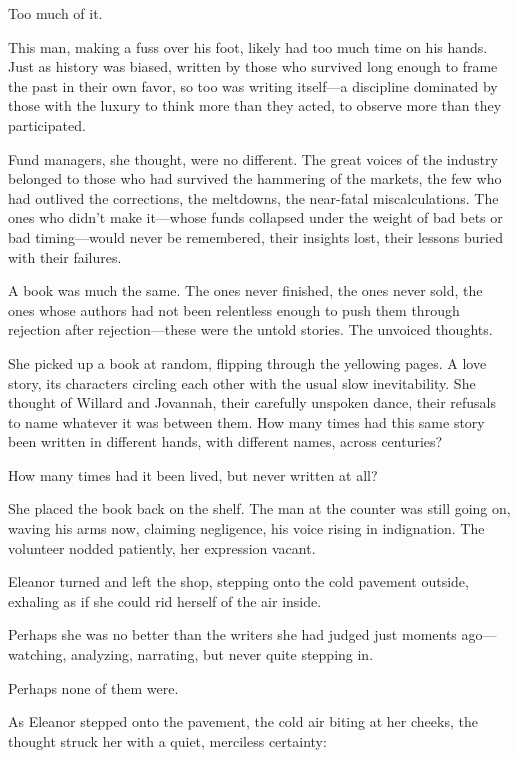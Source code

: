 Too much of it.

This man, making a fuss over his foot, likely had too much time on his hands. Just as history was biased, written by those who survived long enough to frame the past in their own favor, so too was writing itself—a discipline dominated by those with the luxury to think more than they acted, to observe more than they participated.

Fund managers, she thought, were no different. The great voices of the industry belonged to those who had survived the hammering of the markets, the few who had outlived the corrections, the meltdowns, the near-fatal miscalculations. The ones who didn’t make it—whose funds collapsed under the weight of bad bets or bad timing—would never be remembered, their insights lost, their lessons buried with their failures.

A book was much the same. The ones never finished, the ones never sold, the ones whose authors had not been relentless enough to push them through rejection after rejection—these were the untold stories. The unvoiced thoughts.

She picked up a book at random, flipping through the yellowing pages. A love story, its characters circling each other with the usual slow inevitability. She thought of Willard and Jovannah, their carefully unspoken dance, their refusals to name whatever it was between them. How many times had this same story been written in different hands, with different names, across centuries?

How many times had it been lived, but never written at all?

She placed the book back on the shelf. The man at the counter was still going on, waving his arms now, claiming negligence, his voice rising in indignation. The volunteer nodded patiently, her expression vacant.

Eleanor turned and left the shop, stepping onto the cold pavement outside, exhaling as if she could rid herself of the air inside.

Perhaps she was no better than the writers she had judged just moments ago—watching, analyzing, narrating, but never quite stepping in.

Perhaps none of them were.


As Eleanor stepped onto the pavement, the cold air biting at her cheeks, the thought struck her with a quiet, merciless certainty:

